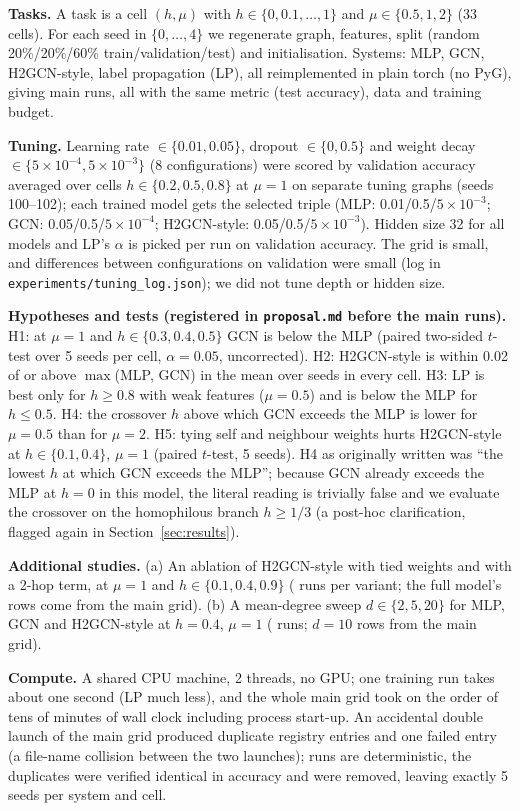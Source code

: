 \textbf{Tasks.} A task is a cell $(h,\mu)$ with $h\in\{0,0.1,\dots,1\}$ and $\mu\in\{0.5,1,2\}$ (33 cells). For each seed in $\{0,\dots,4\}$ we regenerate graph, features, split (random 20\%/20\%/60\% train/validation/test) and initialisation. Systems: MLP, GCN, H2GCN-style, label propagation (LP), all reimplemented in plain torch (no PyG), giving  main runs, all with the same metric (test accuracy), data and training budget.

\textbf{Tuning.} Learning rate $\in\{0.01,0.05\}$, dropout $\in\{0,0.5\}$ and weight decay $\in\{5\!\times\!10^{-4},5\!\times\!10^{-3}\}$ (8 configurations) were scored by validation accuracy averaged over cells $h\in\{0.2,0.5,0.8\}$ at $\mu=1$ on separate tuning graphs (seeds 100--102); each trained model gets the selected triple (MLP: 0.01/0.5/$5\!\times\!10^{-3}$; GCN: 0.05/0.5/$5\!\times\!10^{-4}$; H2GCN-style: 0.05/0.5/$5\!\times\!10^{-3}$). Hidden size 32 for all models and LP's $\alpha$ is picked per run on validation accuracy. The grid is small, and differences between configurations on validation were small (log in \texttt{experiments/tuning\_log.json}); we did not tune depth or hidden size.

\textbf{Hypotheses and tests (registered in \texttt{proposal.md} before the main runs).}
H1: at $\mu=1$ and $h\in\{0.3,0.4,0.5\}$ GCN is below the MLP (paired two-sided $t$-test over 5 seeds per cell, $\alpha=0.05$, uncorrected).
H2: H2GCN-style is within 0.02 of or above $\max$(MLP, GCN) in the mean over seeds in every cell.
H3: LP is best only for $h\ge0.8$ with weak features ($\mu=0.5$) and is below the MLP for $h\le0.5$.
H4: the crossover $h$ above which GCN exceeds the MLP is lower for $\mu=0.5$ than for $\mu=2$.
H5: tying self and neighbour weights hurts H2GCN-style at $h\in\{0.1,0.4\}$, $\mu=1$ (paired $t$-test, 5 seeds).
H4 as originally written was ``the lowest $h$ at which GCN exceeds the MLP''; because GCN already exceeds the MLP at $h=0$ in this model, the literal reading is trivially false and we evaluate the crossover on the homophilous branch $h\ge 1/3$ (a post-hoc clarification, flagged again in Section~\ref{sec:results}).

\textbf{Additional studies.} (a) An ablation of H2GCN-style with tied weights and with a 2-hop term, at $\mu=1$ and $h\in\{0.1,0.4,0.9\}$ ( runs per variant; the full model's rows come from the main grid). (b) A mean-degree sweep $d\in\{2,5,20\}$ for MLP, GCN and H2GCN-style at $h=0.4$, $\mu=1$ ( runs; $d=10$ rows from the main grid).

\textbf{Compute.} A shared CPU machine, 2 threads, no GPU; one training run takes about one second (LP much less), and the whole main grid took on the order of tens of minutes of wall clock including process start-up. An accidental double launch of the main grid produced duplicate registry entries and one failed entry (a file-name collision between the two launches); runs are deterministic, the duplicates were verified identical in accuracy and were removed, leaving exactly 5 seeds per system and cell.
